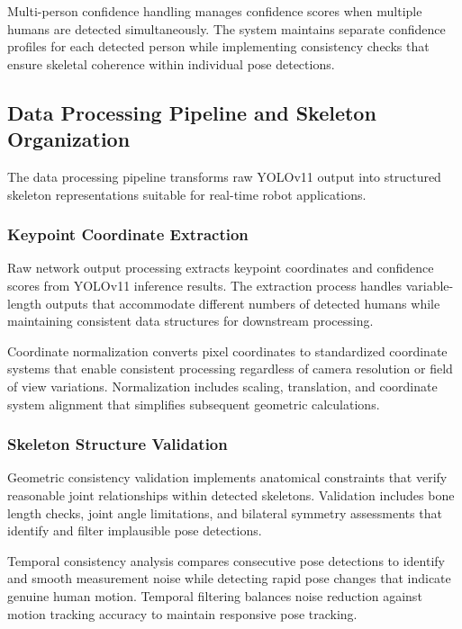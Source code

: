 Multi-person confidence handling manages confidence scores when multiple humans are detected simultaneously. The system maintains separate confidence profiles for each detected person while implementing consistency checks that ensure skeletal coherence within individual pose detections.

\subsection{Data Processing Pipeline and Skeleton Organization}

The data processing pipeline transforms raw YOLOv11 output into structured skeleton representations suitable for real-time robot applications.

\subsubsection{Keypoint Coordinate Extraction}

Raw network output processing extracts keypoint coordinates and confidence scores from YOLOv11 inference results. The extraction process handles variable-length outputs that accommodate different numbers of detected humans while maintaining consistent data structures for downstream processing.

Coordinate normalization converts pixel coordinates to standardized coordinate systems that enable consistent processing regardless of camera resolution or field of view variations. Normalization includes scaling, translation, and coordinate system alignment that simplifies subsequent geometric calculations.

\subsubsection{Skeleton Structure Validation}

Geometric consistency validation implements anatomical constraints that verify reasonable joint relationships within detected skeletons. Validation includes bone length checks, joint angle limitations, and bilateral symmetry assessments that identify and filter implausible pose detections.

Temporal consistency analysis compares consecutive pose detections to identify and smooth measurement noise while detecting rapid pose changes that indicate genuine human motion. Temporal filtering balances noise reduction against motion tracking accuracy to maintain responsive pose tracking.

